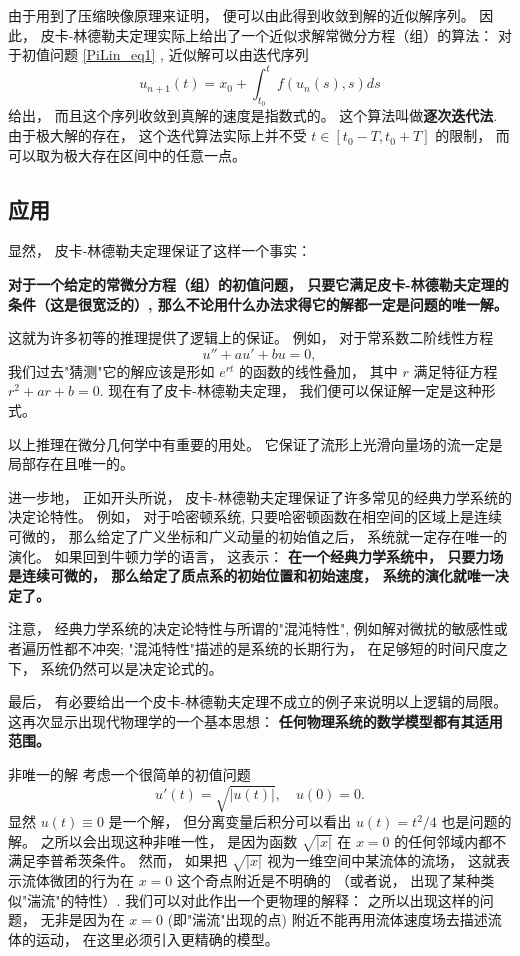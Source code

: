 由于用到了压缩映像原理来证明， 便可以由此得到收敛到解的近似解序列。 因此， 皮卡-林德勒夫定理实际上给出了一个近似求解常微分方程（组）的算法： 对于初值问题 \autoref{PiLin_eq1} , 近似解可以由迭代序列
$$
u_{n+1}(t)=x_0+\int_{t_0}^tf(u_n(s),s)ds
$$
给出， 而且这个序列收敛到真解的速度是指数式的。 这个算法叫做\textbf{逐次迭代法}. 由于极大解的存在， 这个迭代算法实际上并不受 $t\in [t_0-T,t_0+T]$ 的限制， 而可以取为极大存在区间中的任意一点。

\subsection{应用}
显然， 皮卡-林德勒夫定理保证了这样一个事实： 

\textbf{对于一个给定的常微分方程（组）的初值问题， 只要它满足皮卡-林德勒夫定理的条件（这是很宽泛的）, 那么不论用什么办法求得它的解都一定是问题的唯一解。}

这就为许多初等的推理提供了逻辑上的保证。 例如， 对于常系数二阶线性方程
$$
u''+au'+bu=0,
$$
我们过去"猜测"它的解应该是形如 $e^{rt}$ 的函数的线性叠加， 其中 $r$ 满足特征方程 $r^2+ar+b=0$. 现在有了皮卡-林德勒夫定理， 我们便可以保证解一定是这种形式。 

以上推理在微分几何学中有重要的用处。 它保证了流形上光滑向量场的流一定是局部存在且唯一的。

进一步地， 正如开头所说， 皮卡-林德勒夫定理保证了许多常见的经典力学系统的决定论特性。 例如， 对于哈密顿系统, 只要哈密顿函数在相空间的区域上是连续可微的， 那么给定了广义坐标和广义动量的初始值之后， 系统就一定存在唯一的演化。 如果回到牛顿力学的语言， 这表示： \textbf{在一个经典力学系统中， 只要力场是连续可微的， 那么给定了质点系的初始位置和初始速度， 系统的演化就唯一决定了。}

注意， 经典力学系统的决定论特性与所谓的"混沌特性", 例如解对微扰的敏感性或者遍历性都不冲突; "混沌特性"描述的是系统的长期行为， 在足够短的时间尺度之下， 系统仍然可以是决定论式的。

最后， 有必要给出一个皮卡-林德勒夫定理不成立的例子来说明以上逻辑的局限。 这再次显示出现代物理学的一个基本思想： \textbf{任何物理系统的数学模型都有其适用范围。}
\begin{example}{非唯一的解}
考虑一个很简单的初值问题
$$
u'(t)=\sqrt{|u(t)|},\quad u(0)=0.
$$
显然 $u(t)\equiv0$ 是一个解， 但分离变量后积分可以看出 $u(t)=t^2/4$ 也是问题的解。 之所以会出现这种非唯一性， 是因为函数 $\sqrt{|x|}$ 在 $x=0$ 的任何邻域内都不满足李普希茨条件。 然而， 如果把 $\sqrt{|x|}$ 视为一维空间中某流体的流场， 这就表示流体微团的行为在 $x=0$ 这个奇点附近是不明确的 （或者说， 出现了某种类似"湍流"的特性）. 我们可以对此作出一个更物理的解释： 之所以出现这样的问题， 无非是因为在 $x=0$ (即"湍流"出现的点) 附近不能再用流体速度场去描述流体的运动， 在这里必须引入更精确的模型。
\end{example}